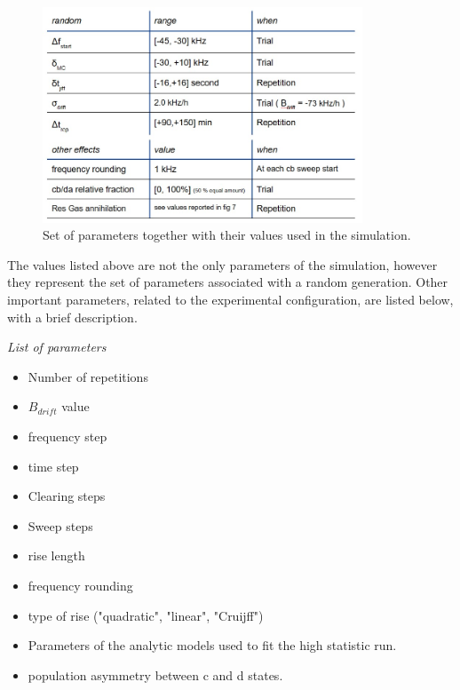 \documentclass[11pt,a4paper,oneside]{article}
\newcommand{\commento}[1]{{\color{purple}{#1}}\vspace{10pt}}
\begin{document}
\begin{figure}[!hbtp]
\centering
\includegraphics[width = 0.85\textwidth]{Screenshot 2024-04-21 173735.jpg}
\caption{ Set of parameters together with their values used in the simulation.}
\end{figure}

The values listed above are not the only parameters of the simulation, however they represent the set of parameters associated with a random generation. Other important parameters, related to the experimental configuration, are listed below, with a brief description.

\begin{center}
\textit{List of parameters}
\commento{\\ aggiungere breve spiegazione ad ognuno di essi, per ora sono solo elencati.}
\end{center}

\begin{itemize}
\item Number of repetitions
\item $B_{drift}$ value
\item frequency step
\item time step
\item Clearing steps
\item Sweep steps
\item rise length 
\item frequency rounding
\item type of rise ("quadratic", "linear", "Cruijff")
\item Parameters of the analytic models used to fit the high statistic run.
\item population asymmetry between c and d states.
\end{itemize}
\end{document}
